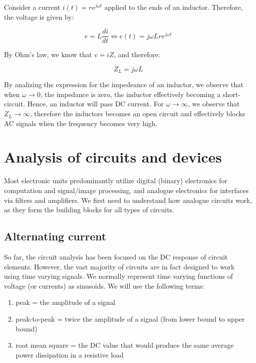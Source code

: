 \documentclass{article}
\begin{document}
\begin{proposition}

Consider a current $i(t) = re^{j\omega t}$ applied to the ends of an inductor. Therefore, the voltage is given by:

\[ e = L\frac{di}{dt} \iff e(t) = j\omega Lre^{j\omega t} \]

By Ohm's law, we know that $v = iZ$, and therefore:

\[ Z_L = j\omega L \]
    
\end{proposition}

By analizing the expression for the impedeance of an inductor, we observe that when $\omega \to 0$, the impedance is zero, the inductor effectively becoming a short-circuit. Hence, an inductor will pass DC current. For $\omega \to \infty$, we observe that $Z_L \to \infty$, therefore the inductors becomes an open circuit and effectively blocks AC signals when the frequency becomes very high.

\newpage

\section{Analysis of circuits and devices}

Most electronic units predominantly utilize digital (binary) electronics for computation and signal/image processing, and analogue electronics for interfaces via filters and amplifiers. We first need to understand how analogue circuits work, as they form the building blocks for all types of circuits.

\subsection{Alternating current}

So far, the circuit analysis has been focused on the DC response of circuit elements. However, the vast majority of circuits are in fact designed to work using time varying signals. We normally represent time varying functions of voltage (or currents) as sinusoids. We will use the following terms:

\begin{enumerate}
    \item peak = the amplitude of a signal
    \item peak-to-peak = twice the amplitude of a signal (from lower bound to upper bound)
    \item root mean square = the DC value that would produce the same average power dissipation in a resistive load
\end{enumerate}
\end{document}
